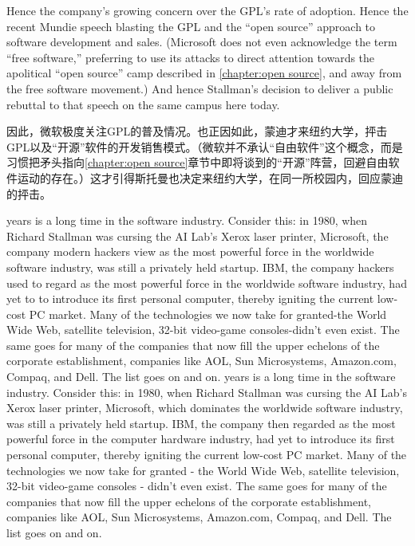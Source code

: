 \ifdefined\vtwo
\ifdefined\eng
Hence the company's growing concern over the GPL's rate of adoption. Hence the recent Mundie speech blasting the GPL and the ``open source'' approach to software development and sales. (Microsoft does not even acknowledge the term ``free software,'' preferring to use its attacks to direct attention towards the apolitical ``open source'' camp described in \autoref{chapter:open source}, and away from the free software movement.) And hence Stallman's decision to deliver a public rebuttal to that speech on the same campus here today.
\fi

\ifdefined\chs
因此，微软极度关注GPL的普及情况。也正因如此，蒙迪才来纽约大学，抨击GPL以及``开源''软件的开发销售模式。（微软并不承认``自由软件''这个概念，而是习惯把矛头指向\autoref{chapter:open source}章节中即将谈到的``开源''阵营，回避自由软件运动的存在。）这才引得斯托曼也决定来纽约大学，在同一所校园内，回应蒙迪的抨击。
\fi
\fi

\ifdefined\eng
\ifdefined{} years is a long time in the software industry. Consider this: in 1980, when Richard Stallman was cursing the AI Lab's Xerox laser printer, Microsoft, the company modern hackers view as the most powerful force in the worldwide software industry, was still a privately held startup. IBM, the company hackers used to regard as the most powerful force in the worldwide software industry, had yet to to introduce its first personal computer, thereby igniting the current low-cost PC market. Many of the technologies we now take for granted-the World Wide Web, satellite television, 32-bit video-game consoles-didn't even exist. The same goes for many of the companies that now fill the upper echelons of the corporate establishment, companies like AOL, Sun Microsystems, Amazon.com, Compaq, and Dell. The list goes on and on.
\fi
\ifdefined{} years is a long time in the software industry. Consider this: in 1980, when Richard Stallman was cursing the AI Lab's Xerox laser printer, Microsoft, which dominates the worldwide software industry, was still a privately held startup. IBM, the company then regarded as the most powerful force in the computer hardware industry, had yet to introduce its first personal computer, thereby igniting the current low-cost PC market. Many of the technologies we now take for granted - the World Wide Web, satellite television, 32-bit video-game consoles - didn't even exist. The same goes for many of the companies that now fill the upper echelons of the corporate establishment, companies like AOL, Sun Microsystems, Amazon.com, Compaq, and Dell. The list goes on and on.
\fi
\fi

